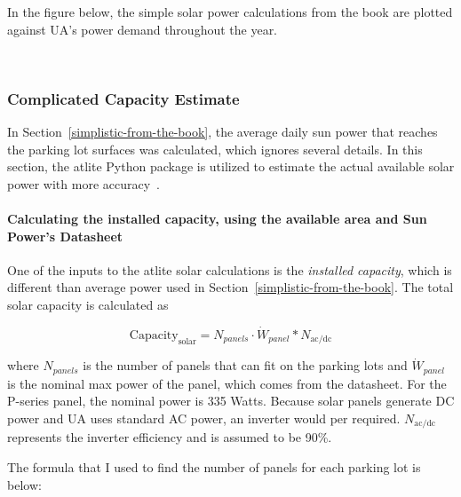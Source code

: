\documentclass[11pt]{article}
\begin{document}
In the figure below, the simple solar power calculations from the book are plotted against UA's power demand throughout the year. 

\begin{center}
\end{center}
{ \hspace*{\fill} \\}

\hypertarget{complicated-capacity-estimate}{%
\subsubsection{Complicated Capacity
Estimate}\label{complicated-capacity-estimate}}

In Section~\ref{simplistic-from-the-book}, the average daily sun power that reaches the parking lot surfaces was calculated, which ignores several details. In this section, the atlite Python package is utilized to estimate the actual available solar power with more accuracy~\citet{Hofmann_Atlite_A_Light-weight_2021}.

\hypertarget{calculating-the-installed-capacity-using-the-available-area-and-sun-powers-datasheet}{%
\paragraph{Calculating the installed capacity, using the available area
and Sun Power's
Datasheet}\label{calculating-the-installed-capacity-using-the-available-area-and-sun-powers-datasheet}}
\rmfamily

One of the inputs to the atlite solar calculations is the \emph{installed capacity}, which is different than average power used in Section~\ref{simplistic-from-the-book}. The total solar capacity is calculated as

\[\textrm{Capacity}_{\textrm{solar}} = N_{panels} \cdot \dot{W}_{panel} * N_{\textrm{ac/dc}}\]

where \(N_{panels}\) is the number of panels that can fit on the parking
lots and $ \dot{W}_{panel}$ is the nominal max power of the panel, which comes from the datasheet. For the P-series panel, the nominal power is 335 Watts. Because solar panels generate DC power and UA uses standard AC power, an inverter would per required. $N_{\textrm{ac/dc}}$ represents the inverter efficiency and is assumed to be 90\%. 

The formula that I used to find the number of panels for each parking lot is below:
\end{document}
